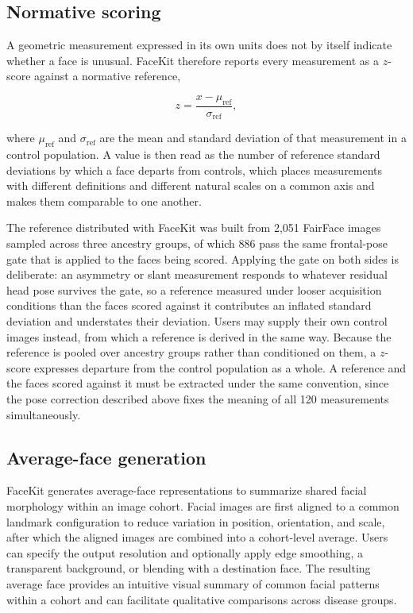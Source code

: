 \documentclass[11pt]{article}
\begin{document}
\subsection{Normative scoring}

A geometric measurement expressed in its own units does not by itself indicate
whether a face is unusual. FaceKit therefore reports every measurement as a
$z$-score against a normative reference,

\begin{equation}
z = \frac{x - \mu_{\mathrm{ref}}}{\sigma_{\mathrm{ref}}},
\end{equation}

where $\mu_{\mathrm{ref}}$ and $\sigma_{\mathrm{ref}}$ are the mean and standard
deviation of that measurement in a control population. A value is then read as
the number of reference standard deviations by which a face departs from
controls, which places measurements with different definitions and different
natural scales on a common axis and makes them comparable to one another.

The reference distributed with FaceKit was built from 2,051 FairFace images
sampled across three ancestry groups, of which 886 pass the same frontal-pose
gate that is applied to the faces being scored. Applying the gate on both sides
is deliberate: an asymmetry or slant measurement responds to whatever residual
head pose survives the gate, so a reference measured under looser acquisition
conditions than the faces scored against it contributes an inflated standard
deviation and understates their deviation. Users may supply their own control
images instead, from which a reference is derived in the same way. Because the
reference is pooled over ancestry groups rather than conditioned on them, a
$z$-score expresses departure from the control population as a whole. A
reference and the faces scored against it must be extracted under the same
convention, since the pose correction described above fixes the meaning of all
120 measurements simultaneously.

\subsection{Average-face generation}

FaceKit generates average-face representations to summarize shared facial morphology within an image cohort. Facial images are first aligned to a common landmark configuration to reduce variation in position, orientation, and scale, after which the aligned images are combined into a cohort-level average. Users can specify the output resolution and optionally apply edge smoothing, a transparent background, or blending with a destination face. The resulting average face provides an intuitive visual summary of common facial patterns within a cohort and can facilitate qualitative comparisons across disease groups.
\end{document}
